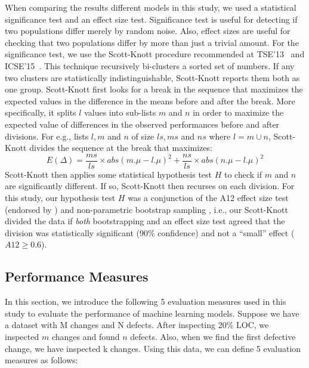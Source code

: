 \documentclass[10pt,journal,compsoc]{IEEEtran}
\begin{document}
When comparing the results different models in this study, we used a statistical significance test and an effect size test. Significance test is useful for detecting if two populations
differ merely by random noise. Also, effect sizes are useful for checking that two populations differ by more than just a trivial amount. For the significance test,  we use the Scott-Knott procedure  recommended at TSE'13~\cite{mittas2013ranking} and ICSE'15~\cite{ghotra2015revisiting}. This technique recursively bi-clusters a sorted set of numbers. If any two clusters are statistically indistinguishable, Scott-Knott reports them both as one group. Scott-Knott first looks for a break in the sequence that maximizes the expected values in the difference in the means before and after the break. More specifically,  it  splits $l$ values into sub-lists $m$ and $n$ in order to maximize the expected value of differences  in the observed performances before and after divisions. For e.g., lists $l,m$ and $n$ of size $ls,ms$ and $ns$ where $l=m\cup n$, Scott-Knott divides the sequence at the break that maximizes:
\begin{equation}
    E(\Delta)=\frac{ms}{ls}\times abs(m.\mu - l.\mu)^2  + \frac{ns}{ls}\times abs(n.\mu - l.\mu)^2
\end{equation}
Scott-Knott then applies some statistical hypothesis test $H$ to check if $m$ and $n$ are significantly different. If so, Scott-Knott then recurses on each division. For this study, our hypothesis test $H$ was a conjunction of the A12 effect size test (endorsed by \cite{arcuri2011practical})  and non-parametric bootstrap sampling \cite{efron94}, i.e., our Scott-Knott divided the data if {\em both} bootstrapping and an effect size test agreed that the division was statistically significant (90\% confidence) and not a ``small'' effect ($A12 \ge 0.6$).



\subsection{Performance Measures}
\label{sec:Measures}

In this section, we introduce the following 5 evaluation measures used in this study to evaluate the performance of machine learning models. Suppose we have a dataset with M changes and N defects. After inspecting 20\% LOC, we inspected $m$ changes and found $n$ defects. Also, when we find the first defective change, we have inspected k changes. Using
this data, we can define 5 evaluation measures  as follows:
\end{document}
